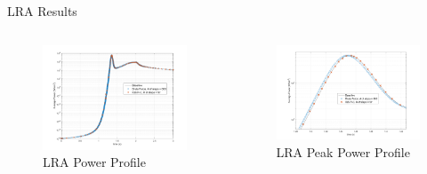 \documentclass[8pt,xcolor=dvipnames]{beamer}
\begin{document}
\begin{frame}{LRA Results}

\begin{columns}

\begin{figure}
\includegraphics[width=\linewidth]{figures/LRA_DT2.png}
\caption{LRA Power Profile}
\end{figure}

\begin{figure}
\includegraphics[width=\linewidth]{figures/LRA_DT2_peak.png}
\caption{LRA Peak Power Profile}
\end{figure}

\end{columns}


\end{frame}
\end{document}

